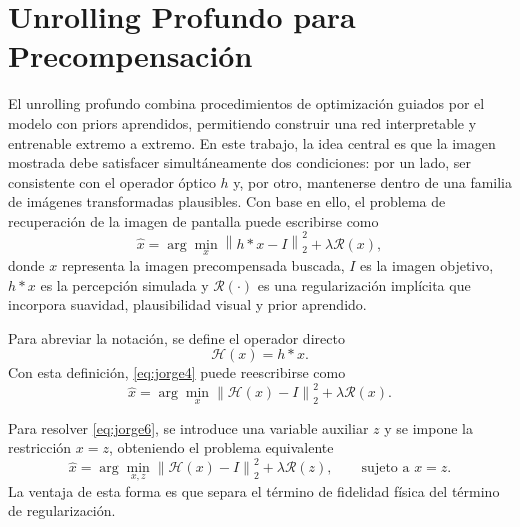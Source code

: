 \documentclass[conference]{IEEEtran}
\begin{document}
\section{Unrolling Profundo para Precompensación}
El unrolling profundo combina procedimientos de optimización guiados por el modelo con priors aprendidos, permitiendo construir una red interpretable y entrenable extremo a extremo. En este trabajo, la idea central es que la imagen mostrada debe satisfacer simultáneamente dos condiciones: por un lado, ser consistente con el operador óptico $h$ y, por otro, mantenerse dentro de una familia de imágenes transformadas plausibles. Con base en ello, el problema de recuperación de la imagen de pantalla puede escribirse como
\begin{equation}
\hat{x}
=
\arg\min_x
\left\|
h*x-I
\right\|_2^2
+
\lambda \mathcal{R}(x),
\label{eq:jorge4}
\end{equation}
donde $x$ representa la imagen precompensada buscada, $I$ es la imagen objetivo, $h*x$ es la percepción simulada y $\mathcal{R}(\cdot)$ es una regularización implícita que incorpora suavidad, plausibilidad visual y prior aprendido.

Para abreviar la notación, se define el operador directo
\begin{equation}
\mathcal{H}(x)=h*x.
\label{eq:jorge5}
\end{equation}
Con esta definición, \eqref{eq:jorge4} puede reescribirse como
\begin{equation}
\hat{x}
=
\arg\min_x
\left\|
\mathcal{H}(x)-I
\right\|_2^2
+
\lambda \mathcal{R}(x).
\label{eq:jorge6}
\end{equation}

Para resolver \eqref{eq:jorge6}, se introduce una variable auxiliar $z$ y se impone la restricción $x=z$, obteniendo el problema equivalente
\begin{equation}
\hat{x}
=
\arg\min_{x,z}
\left\|
\mathcal{H}(x)-I
\right\|_2^2
+
\lambda \mathcal{R}(z),
\qquad
\text{sujeto a } x=z.
\label{eq:jorge7}
\end{equation}
La ventaja de esta forma es que separa el término de fidelidad física del término de regularización.
\end{document}
